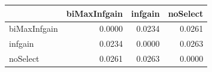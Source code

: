 \begin{tabular}{lrrr}
\toprule
 & biMaxInfgain & infgain & noSelect \\
\midrule
biMaxInfgain & 0.0000 & 0.0234 & 0.0261 \\
infgain & 0.0234 & 0.0000 & 0.0263 \\
noSelect & 0.0261 & 0.0263 & 0.0000 \\
\bottomrule
\end{tabular}
